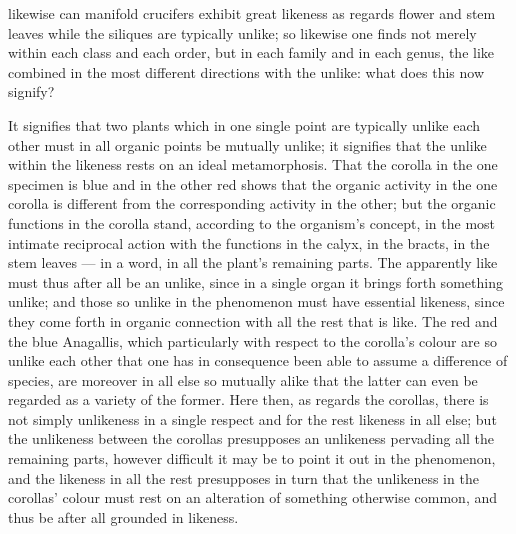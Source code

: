 \documentclass[12pt,a4paper]{book}
\begin{document}
likewise can manifold crucifers exhibit great likeness as regards flower and stem
leaves while the siliques are typically unlike; so likewise one finds not merely
within each class and each order, but in each family and in each genus, the like
combined in the most different directions with the unlike: what does this now
signify?

It signifies that two plants which in one single point are typically unlike each
other must in all organic points be mutually unlike; it signifies that the unlike
within the likeness rests on an ideal metamorphosis. That the corolla in the one
specimen is blue and in the other red shows that the organic activity in the one
corolla is different from the corresponding activity in the other; but the organic
functions in the corolla stand, according to the organism's concept, in the most
intimate reciprocal action with the functions in the calyx, in the bracts, in the
stem leaves --- in a word, in all the plant's remaining parts. The apparently like
must thus after all be an unlike, since in a single organ it brings forth something
unlike; and those so unlike in the phenomenon must have essential likeness, since
they come forth in organic connection with all the rest that is like. The red and
the blue Anagallis, which particularly with respect to the corolla's colour are so
unlike each other that one has in consequence been able to assume a difference of
species, are moreover in all else so mutually alike that the latter can even be
regarded as a variety of the former. Here then, as regards the corollas, there is
not simply unlikeness in a single respect and for the rest likeness in all else;
but the unlikeness between the corollas presupposes an unlikeness pervading all the
remaining parts, however difficult it may be to point it out in the phenomenon, and
the likeness in all the rest presupposes in turn that the unlikeness in the
corollas' colour must rest on an alteration of something otherwise common, and thus
be after all grounded in likeness.
\end{document}
